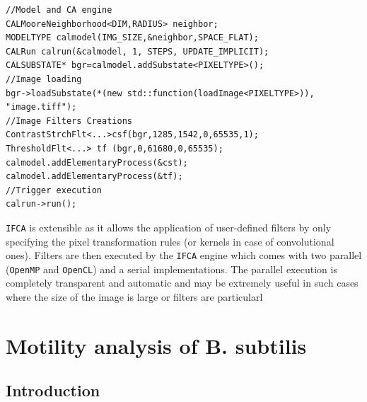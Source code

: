 \begin{lstlisting}
//Model and CA engine
CALMooreNeighborhood<DIM,RADIUS> neighbor;
MODELTYPE calmodel(IMG_SIZE,&neighbor,SPACE_FLAT);
CALRun calrun(&calmodel, 1, STEPS, UPDATE_IMPLICIT); 
CALSUBSTATE* bgr=calmodel.addSubstate<PIXELTYPE>();
//Image loading
bgr->loadSubstate(*(new std::function(loadImage<PIXELTYPE>)), "image.tiff");
//Image Filters Creations
ContrastStrchFlt<...>csf(bgr,1285,1542,0,65535,1);
ThresholdFlt<...> tf (bgr,0,61680,0,65535);
calmodel.addElementaryProcess(&cst);
calmodel.addElementaryProcess(&tf);
//Trigger execution
calrun->run();
\end{lstlisting}

\texttt{IFCA} is extensible as it allows the application of user-defined filters by only specifying the pixel transformation rules (or kernels in case of convolutional ones). 
Filters are then executed by the \texttt{IFCA} engine which comes with two parallel (\texttt{OpenMP} and \texttt{OpenCL})  and a serial implementations.
The parallel execution is completely transparent and automatic and may be extremely useful in such cases where the size of the image is large or filters are particularl



\section{Motility analysis of B. subtilis}
\label{sect:bacteriaanalysis}
\subsection{Introduction}

